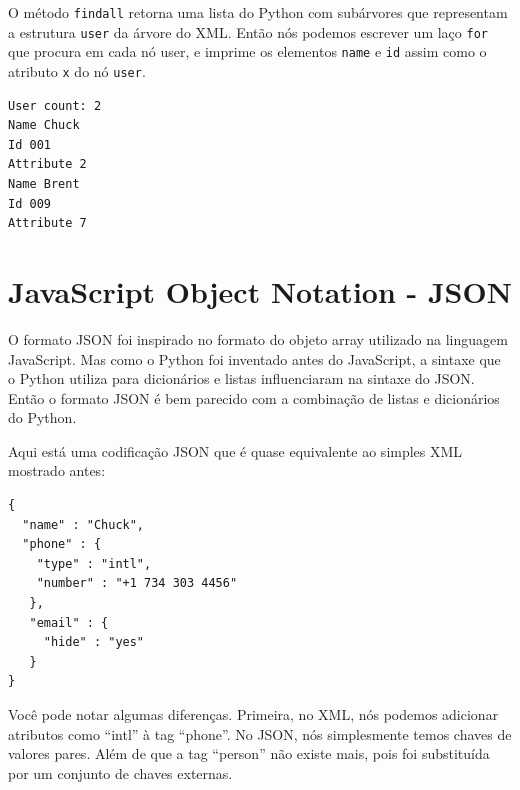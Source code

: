 O método {\tt findall} retorna uma lista do Python com subárvores
que representam a estrutura {\tt user} da árvore do XML. Então nós 
podemos escrever um laço {\tt for} que procura em cada nó user,
e imprime os elementos {\tt name} e {\tt id} assim como o 
atributo {\tt x} do nó {\tt user}.

\beforeverb
\begin{verbatim}
User count: 2
Name Chuck
Id 001
Attribute 2
Name Brent
Id 009
Attribute 7
\end{verbatim}
\afterverb

\section{JavaScript Object Notation - JSON}

O formato JSON foi inspirado no formato do objeto array utilizado na linguagem JavaScript.
Mas como o Python foi inventado antes do JavaScript, a sintaxe que o Python utiliza
para dicionários e listas influenciaram na sintaxe do JSON. Então o formato JSON é
bem parecido com a combinação de listas e dicionários do Python.

Aqui está uma codificação JSON que é quase equivalente ao simples XML mostrado antes:

\beforeverb
\begin{verbatim}
{
  "name" : "Chuck",
  "phone" : {
    "type" : "intl",
    "number" : "+1 734 303 4456"
   },
   "email" : {
     "hide" : "yes"
   }
}
\end{verbatim}
\afterverb

Você pode notar algumas diferenças. Primeira, no XML, nós podemos adicionar
atributos como ``intl'' à tag ``phone''. No JSON, nós simplesmente temos chaves de
valores pares. Além de que a tag ``person'' não existe mais, pois foi substituída por
um conjunto de chaves externas.

